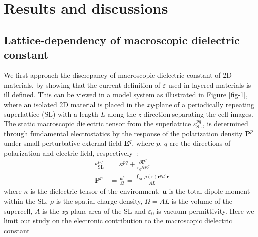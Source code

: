 
\section{Results and discussions}
\label{sec:results-discussions}

\subsection{Lattice-dependency of macroscopic dielectric constant}
\label{sec:latt-depend-macr}

We first approach the discrepancy of macroscopic dielectric constant
of 2D materials, by showing that the current definition of
$\varepsilon$ used in layered materials is ill defined.  This can be
viewed in a model system as illustrated
in Figure \ref{fig-1}, where an isolated 2D material is placed in
the \textit{xy}-plane of a periodically repeating superlattice (SL)
with a length $L$ along the \textit{z}-direction separating the cell
images. The static macroscopic dielectric tensor from the superlattice
$\varepsilon_{\mathrm{SL}}^{pq}$, is determined through fundamental
electrostatics by the response of the polarization density
$\boldsymbol{P}^{p}$ under small perturbative external field
$\boldsymbol{E}^{q}$, where $p$, $q$ are the directions of
polarization and electric field,
respectively~\cite{Dressel_2001_electrodynamics}:
\begin{subequations}
  \begin{eqnarray}
      \label{eq:def-eps-1}
    &\varepsilon_{\mathrm{SL}}^{pq} &= \kappa^{pq} +
                                 {\displaystyle \frac{\partial \boldsymbol{P}^{p}}
                                 {\varepsilon_{0} \partial \boldsymbol{E}^{q}}} \\
          \label{eq:def-eps-2}
    &\boldsymbol{P}^{p} &=  {\displaystyle \frac{\boldsymbol{u}^{p}}{\Omega}}
                          = {\displaystyle \frac{{\displaystyle
          \int_{\mathrm{SL}} \rho(\boldsymbol{r}) \boldsymbol{r}^{p} d^{3}\boldsymbol{r}}}
                          {AL}}
  \end{eqnarray}
\end{subequations}
where $\kappa$ is the dielectric tensor of the environment,
$\boldsymbol{u}$ is the total dipole moment within the SL, $\rho$ is
the spatial charge density, $\Omega=AL$ is the volume of the
supercell, $A$ is the \textit{xy}-plane area of the SL and
$\varepsilon_{0}$ is vacuum permittivity. Here we limit out study on
the electronic contribution to the macroscopic dielectric constant
